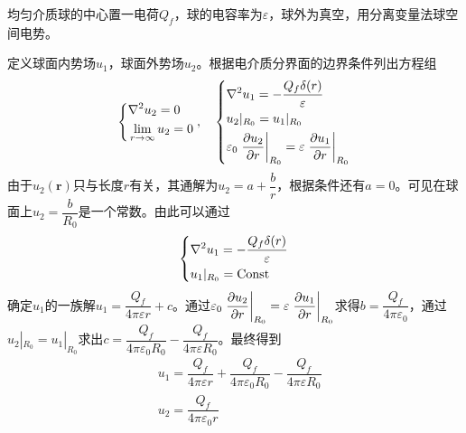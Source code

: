 \documentclass{mynote}
\begin{document}
\begin{exercise}{2.3}
    均匀介质球的中心置一电荷$Q_f$，球的电容率为$\varepsilon$，球外为真空，用分离变量法球空间电势。
\end{exercise}
\begin{solution}
    定义球面内势场$u_1$，球面外势场$u_2$。根据电介质分界面的边界条件列出方程组
    \[
        \left\{
        \begin{aligned}
            & \nabla^2 u_2 = 0 \\
            & \lim_{r \to \infty} u_2 = 0
        \end{aligned} 
    \right.  
     ,\quad 
     \left\{
        \begin{aligned}
            & \nabla^2 u_1 = - \frac{Q_f\delta(r)}{\varepsilon} \\
            & u_2|_{R_0} = u_1|_{R_0} \\
            & \varepsilon_0 \left. \dfrac{\partial u_2}{\partial r} \right|_{R_0} = \varepsilon \left. \dfrac{\partial u_1}{\partial r} \right|_{R_0} \\
        \end{aligned} 
    \right.
    \]
    由于$u_2(\bm{r})$只与长度$r$有关，其通解为$u_2 = a + \dfrac{b}{r}$，根据条件还有$a = 0$。可见在球面上$u_2 = \dfrac{b}{R_0}$是一个常数。由此可以通过
    \[
        \left\{
            \begin{aligned}
                & \nabla^2 u_1 = - \frac{Q_f\delta(r)}{\varepsilon} \\
                & u_1|_{R_0} = \mathrm{Const}
            \end{aligned} 
        \right.
    \]
    确定$u_1$的一族解$u_1 = \dfrac{Q_f}{4\pi \varepsilon r} + c$。通过$ \varepsilon_0 \left. \dfrac{\partial u_2}{\partial r} \right|_{R_0} = \varepsilon \left. \dfrac{\partial u_1}{\partial r} \right|_{R_0}$求得$b = \dfrac{Q_f}{4\pi \varepsilon_0}$，通过$u_2|_{R_0} = u_1|_{R_0}$求出$c = \dfrac{Q_f}{4\pi \varepsilon_0 R_0} - \dfrac{Q_f}{4\pi \varepsilon R_0}$。最终得到
    \begin{align*}
        & u_1 = \dfrac{Q_f}{4\pi \varepsilon r} + \dfrac{Q_f}{4\pi \varepsilon_0 R_0} - \dfrac{Q_f}{4\pi \varepsilon R_0} \\
        & u_2 = \dfrac{Q_f}{4\pi \varepsilon_0 r }
    \end{align*}

\end{solution}
\end{document}
